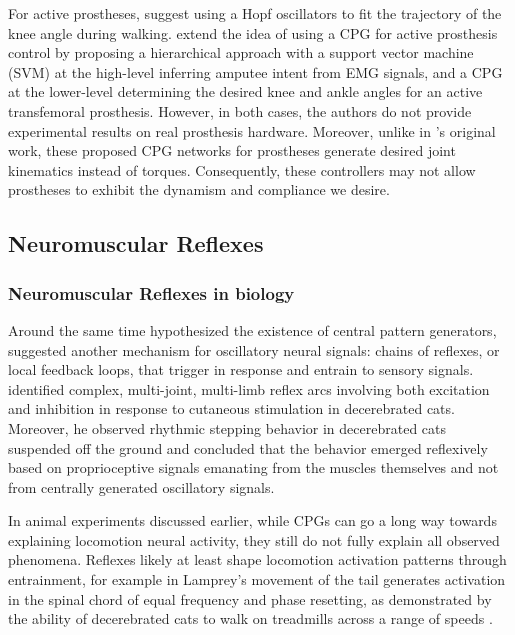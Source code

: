 For active prostheses, \citet{geng2012design} suggest using a Hopf oscillators
to fit the trajectory of the knee angle during walking. \citet{guo2010study}
extend the idea of using a CPG for active prosthesis control by proposing a
hierarchical approach with a support vector machine (SVM) at the high-level
inferring amputee intent from EMG signals, and a CPG at the lower-level
determining the desired knee and ankle angles for an active transfemoral
prosthesis. However, in both cases, the authors do not provide experimental
results on real prosthesis hardware. Moreover, unlike in
\citeauthor{taga1991self}'s original work, these proposed CPG networks for
prostheses generate desired joint kinematics instead of torques. Consequently,
these controllers may not allow prostheses to exhibit the dynamism and
compliance we desire.

\subsection{Neuromuscular Reflexes}\label{sec:neuromuscular_background}
\subsubsection{Neuromuscular Reflexes in biology}
Around the same time \citeauthor{brown1911intrinsic} hypothesized the existence
of central pattern generators, \citet{sherrington1910integrative,
sherrington1910flexion} suggested another mechanism for oscillatory neural
signals: chains of reflexes, or local feedback loops, that trigger in response
and entrain to sensory signals. \citeauthor{sherrington1910integrative}
identified complex, multi-joint, multi-limb reflex arcs involving both
excitation and inhibition in response to cutaneous stimulation in decerebrated
cats. Moreover, he observed rhythmic stepping behavior in decerebrated cats
suspended off the ground and concluded that the behavior emerged reflexively
based on proprioceptive signals emanating from the muscles themselves and not
from centrally generated oscillatory signals.

In animal experiments discussed earlier, while CPGs can go a long way towards
explaining locomotion neural activity, they still do not fully explain all
observed phenomena. Reflexes likely at least shape locomotion activation
patterns through entrainment, for example in Lamprey's movement of the tail
generates activation in the spinal chord of equal frequency
\citep{mcclellan1993mechanosensory} and phase resetting, as demonstrated by the
ability of decerebrated cats to walk on treadmills across a range of speeds
\citep{rossignol2000locomotion}.

